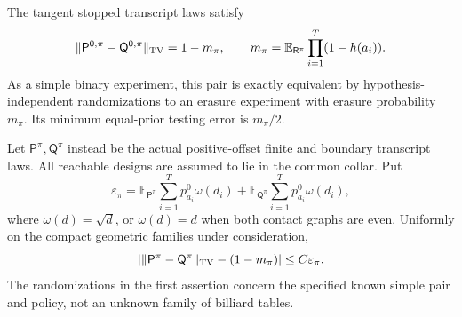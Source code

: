 \begin{theorem}
\label{thm:v16-adaptive-critical}
The tangent stopped transcript laws satisfy
\begin{equation}\label{eq:v16-overlap-functional}
 \|\mathsf P^{0,\pi}-\mathsf Q^{0,\pi}\|_{\rm TV}
     =1-m_\pi,\qquad
 m_\pi=\mathbb E_{\mathsf R^\pi}
                   \prod_{i=1}^{T}(1-h(a_i)).
\end{equation}
As a simple binary experiment, this pair is exactly equivalent by
hypothesis-independent randomizations to an erasure experiment with
erasure probability $m_\pi$. Its minimum equal-prior testing error is
$m_\pi/2$.

Let $\mathsf P^\pi,\mathsf Q^\pi$ instead be the actual positive-offset
finite and boundary transcript laws. All reachable designs are assumed
to lie in the common collar. Put
\begin{equation}\label{eq:v16-adaptive-tangent-budget}
 \varepsilon_\pi=
   \mathbb E_{\mathsf P^\pi}\sum_{i=1}^{T}p_{a_i}^0\omega(d_i)
  +\mathbb E_{\mathsf Q^\pi}\sum_{i=1}^{T}p_{a_i}^0\omega(d_i),
\end{equation}
where $\omega(d)=\sqrt d$, or $\omega(d)=d$ when both contact graphs
are even. Uniformly on the compact geometric families under consideration,
\begin{equation}\label{eq:v16-adaptive-critical-physical}
 \left|\|\mathsf P^\pi-\mathsf Q^\pi\|_{\rm TV}
                                 -(1-m_\pi)\right|
                           \le C\varepsilon_\pi.
\end{equation}
The randomizations in the first assertion concern the specified known
simple pair and policy, not an unknown family of billiard tables.
\end{theorem}
